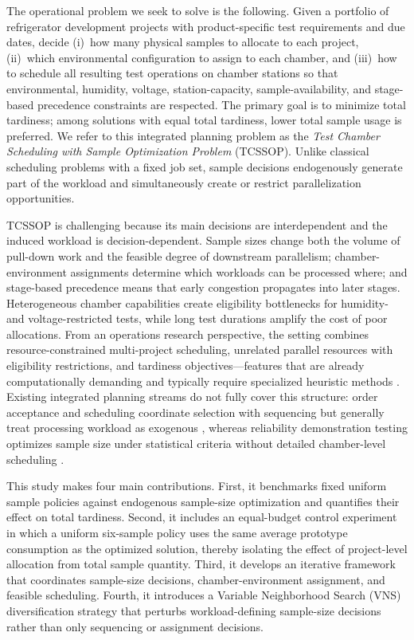 \documentclass[11pt]{article}
\begin{document}
The operational problem we seek to solve is the following. Given a portfolio of refrigerator development projects with product-specific test requirements and due dates, decide (i)~how many physical samples to allocate to each project, (ii)~which environmental configuration to assign to each chamber, and (iii)~how to schedule all resulting test operations on chamber stations so that environmental, humidity, voltage, station-capacity, sample-availability, and stage-based precedence constraints are respected. The primary goal is to minimize total tardiness; among solutions with equal total tardiness, lower total sample usage is preferred. We refer to this integrated planning problem as the \emph{Test Chamber Scheduling with Sample Optimization Problem} (TCSSOP). Unlike classical scheduling problems with a fixed job set, sample decisions endogenously generate part of the workload and simultaneously create or restrict parallelization opportunities.

TCSSOP is challenging because its main decisions are interdependent and the induced workload is decision-dependent. Sample sizes change both the volume of pull-down work and the feasible degree of downstream parallelism; chamber-environment assignments determine which workloads can be processed where; and stage-based precedence means that early congestion propagates into later stages. Heterogeneous chamber capabilities create eligibility bottlenecks for humidity- and voltage-restricted tests, while long test durations amplify the cost of poor allocations. From an operations research perspective, the setting combines resource-constrained multi-project scheduling, unrelated parallel resources with eligibility restrictions, and tardiness objectives---features that are already computationally demanding and typically require specialized heuristic methods \citep{HartmannBriskorn2022,GomezSanchezLallaRuizFernandezGilCastroVoss2023,UlagaDurasevicJakobovic2022,MaeckerShenMonch2023,AfzaliradRezaeian2016}. Existing integrated planning streams do not fully cover this structure: order acceptance and scheduling coordinate selection with sequencing but generally treat processing workload as exogenous \citep{Slotnick2011,WangYe2019}, whereas reliability demonstration testing optimizes sample size under statistical criteria without detailed chamber-level scheduling \citep{Fernandez2022}.

This study makes four main contributions. First, it benchmarks fixed uniform sample policies against endogenous sample-size optimization and quantifies their effect on total tardiness. Second, it includes an equal-budget control experiment in which a uniform six-sample policy uses the same average prototype consumption as the optimized solution, thereby isolating the effect of project-level allocation from total sample quantity. Third, it develops an iterative framework that coordinates sample-size decisions, chamber-environment assignment, and feasible scheduling. Fourth, it introduces a Variable Neighborhood Search (VNS) diversification strategy that perturbs workload-defining sample-size decisions rather than only sequencing or assignment decisions.
\end{document}
